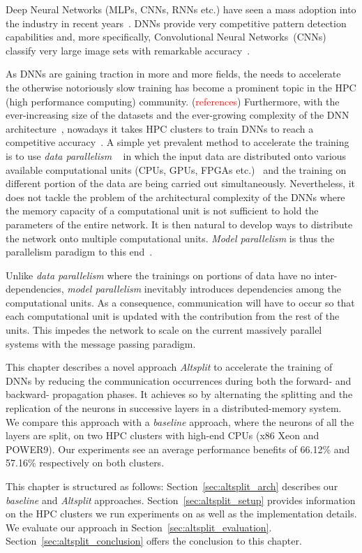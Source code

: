 Deep Neural Networks (MLPs, CNNs, RNNs etc.) have seen a mass adoption into the
industry in recent years~\cite{Acoustic, Language, Ciregan2012}. DNNs provide
very competitive pattern detection capabilities and, more specifically,
Convolutional Neural Networks~(CNNs) classify very large image sets with
remarkable accuracy~\cite{Krizhevsky2012}. 

As DNNs are gaining traction in more and more fields, the needs to accelerate
the otherwise notoriously slow training has become a prominent topic in the
HPC (high performance computing) community. (\textcolor{red}{references})
Furthermore, with the ever-increasing size of the datasets and the
ever-growing complexity of the DNN architecture~\cite{resnet, Inception,
transformersXL}, nowadays it takes HPC clusters to train DNNs to reach a
competitive accuracy~\cite{model0}. A simple yet prevalent method to
accelerate the training is to use \emph{data parallelism} ~\cite{model1,
pserver} in which the input data are distributed onto various available
computational units (CPUs, GPUs, FPGAs etc.)~\cite{You17, fpga_dnn, tpu} and
the training on different portion of the data are being carried out
simultaneously. Nevertheless, it does not tackle the problem of the
architectural complexity of the DNNs where the memory capacity of a
computational unit is not sufficient to hold the parameters of the entire
network. It is then natural to develop ways to distribute the network onto
multiple computational units. \emph{Model parallelism} is thus the
parallelism paradigm to this end~\cite{model0,model1}.

Unlike \emph{data parallelism} where the trainings on portions of data have
no inter-dependencies, \emph{model parallelism} inevitably introduces
dependencies among the computational units. As a consequence, communication
will have to occur so that each computational unit is updated with the
contribution from the rest of the units. This impedes the network to scale on
the current massively parallel systems with the message passing paradigm.

This chapter describes a novel approach \emph{Altsplit} to accelerate the
training of DNNs by reducing the communication occurrences during both the
forward- and backward- propagation phases. It achieves so by alternating the
splitting and the replication of the neurons in successive layers in a
distributed-memory system. We compare this approach with a \emph{baseline}
approach, where the neurons of all the layers are split, on two HPC clusters
with high-end CPUs (x86 Xeon and POWER9). Our experiments see an average
performance benefits of 66.12\% and 57.16\% respectively on both clusters.

This chapter is structured as follows: Section~\ref{sec:altsplit_arch} describes 
our \emph{baseline} and \emph{Altsplit} approaches. Section~\ref{sec:altsplit_setup} 
provides information on the HPC clusters we run experiments on as well as the 
implementation details. We evaluate our approach in Section~\ref{sec:altsplit_evaluation}.
Section~\ref{sec:altsplit_conclusion} offers the conclusion to this chapter.